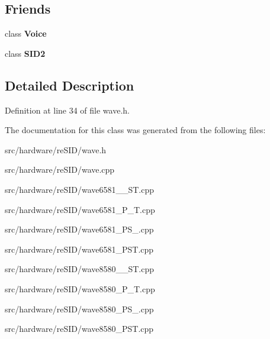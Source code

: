 \subsection*{Friends}
\begin{DoxyCompactItemize}
\item 
\hypertarget{classWaveformGenerator_a24657954e9f1d12330a031c549e6e850}{class {\bfseries Voice}}\label{classWaveformGenerator_a24657954e9f1d12330a031c549e6e850}

\item 
\hypertarget{classWaveformGenerator_a906a1c7f73b30e819416802226bba3ff}{class {\bfseries S\-I\-D2}}\label{classWaveformGenerator_a906a1c7f73b30e819416802226bba3ff}

\end{DoxyCompactItemize}


\subsection{Detailed Description}


Definition at line 34 of file wave.\-h.



The documentation for this class was generated from the following files\-:\begin{DoxyCompactItemize}
\item 
src/hardware/re\-S\-I\-D/wave.\-h\item 
src/hardware/re\-S\-I\-D/wave.\-cpp\item 
src/hardware/re\-S\-I\-D/wave6581\-\_\-\-\_\-\-S\-T.\-cpp\item 
src/hardware/re\-S\-I\-D/wave6581\-\_\-\-P\-\_\-\-T.\-cpp\item 
src/hardware/re\-S\-I\-D/wave6581\-\_\-\-P\-S\-\_\-.\-cpp\item 
src/hardware/re\-S\-I\-D/wave6581\-\_\-\-P\-S\-T.\-cpp\item 
src/hardware/re\-S\-I\-D/wave8580\-\_\-\-\_\-\-S\-T.\-cpp\item 
src/hardware/re\-S\-I\-D/wave8580\-\_\-\-P\-\_\-\-T.\-cpp\item 
src/hardware/re\-S\-I\-D/wave8580\-\_\-\-P\-S\-\_\-.\-cpp\item 
src/hardware/re\-S\-I\-D/wave8580\-\_\-\-P\-S\-T.\-cpp\end{DoxyCompactItemize}
